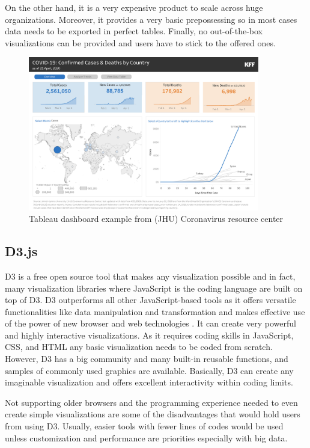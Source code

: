 On the other hand, it is a very expensive product to scale across huge organizations. Moreover, it provides a very basic prepossessing so in most cases data needs to be exported in perfect tables. Finally, no out-of-the-box visualizations can be provided and users have to stick to the offered ones.


\begin{figure}[H]
\centering
\captionsetup{justification=centering}
\includegraphics[width=0.9\textwidth]{Report-latex/tex_files/pics/tableau.png}
\caption{Tableau dashboard example from (JHU) Coronavirus resource center}
\end{figure}



\subsection{D3.js}

D3 is a free open source tool that makes any visualization possible and in fact, many visualization libraries where JavaScript is the coding language are built on top of D3. D3 outperforms all other JavaScript-based tools as it offers versatile functionalities like data manipulation and transformation and makes effective use of the power of new browser and web technologies \cite{nair2016interactive}. It can create very powerful and highly interactive visualizations. As it requires coding skills in JavaScript, CSS, and HTML any basic visualization needs to be coded from scratch. However, D3 has a big community and many built-in reusable functions, and samples of commonly used graphics are available. Basically, D3 can create any imaginable visualization and offers excellent interactivity within coding limits. 

Not supporting older browsers and the programming experience needed to even create simple visualizations are some of the disadvantages that would hold users from using D3. Usually, easier tools with fewer lines of codes would be used unless customization and performance are priorities especially with big data. 

